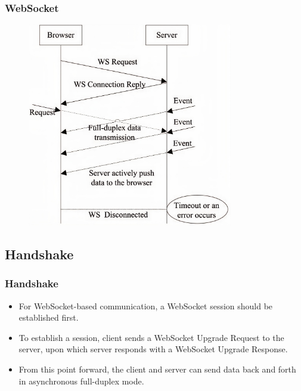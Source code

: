 \documentclass{beamer}
\begin{document}
\begin{frame}
    \frametitle{WebSocket}
    \begin{figure}
        \includegraphics[width=0.8\textwidth]{images/WebSocket.jpeg}
    \end{figure}
\end{frame}

\subsection{Handshake}
\begin{frame}
    \frametitle{Handshake}
    \begin{itemize}[<+->]
        \item For WebSocket-based communication, a \alert{WebSocket session} should be
              established first.
        \item To establish a session, client sends a WebSocket \alert{Upgrade Request} to the
              server, upon which server responds with a WebSocket \alert{Upgrade Response}.
        \item From this point forward, the client and server can \alert{send data back and
                  forth in asynchronous full-duplex mode}.
    \end{itemize}
\end{frame}
\end{document}
